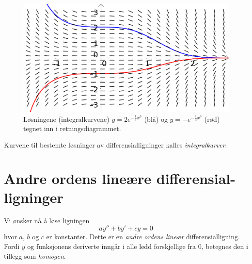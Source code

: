 \begin{figure}
		\centering
	\includegraphics[scale=1]{retn2}
	\caption{Løsningene (integralkurvene) $ {y=2e^{-\frac{1}{3}x^3}} $ (blå) og $ {y=-e^{-\frac{1}{3}x^3}} $ (rød) tegnet inn i retningsdiagrammet.}
\end{figure}
Kurvene til bestemte løsninger av differensialligninger kalles \textit{integralkurver}. 
\newpage
\section[Andre ordens lineære differensialligninger]{Andre ordens lineære differensial- \\ ligninger\label{sode}}
Vi ønsker nå å løse ligningen
\begin{equation}
ay''+by'+cy=0 \label{sodeeq}
\end{equation}
hvor $ a $, $ b $ og $ c $ er konstanter. Dette er en \textit{andre ordens lineær} differensialligning. Fordi $ y $ og funksjonens deriverte inngår i alle ledd forskjellige fra 0, betegnes den i tillegg som \textit{homogen}.\vsk

